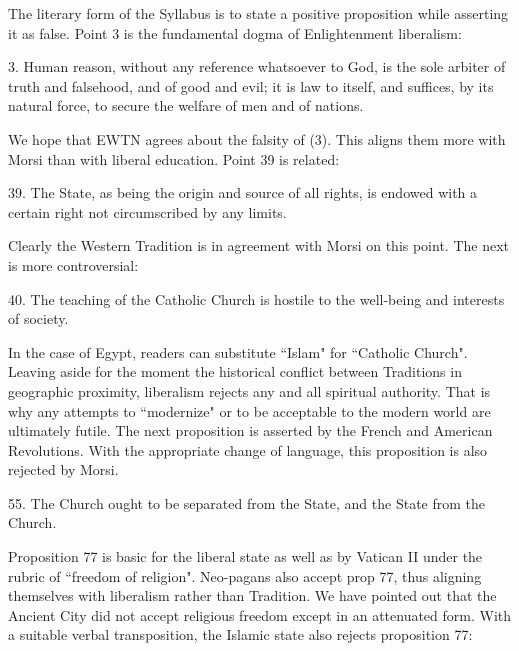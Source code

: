 The literary form of the Syllabus is to state a positive proposition while asserting it as false. Point 3 is the fundamental dogma of Enlightenment liberalism:

\begin{quotex}
3. Human reason, without any reference whatsoever to God, is the sole arbiter of truth and falsehood, and of good and evil; it is law to itself, and suffices, by its natural force, to secure the welfare of men and of nations. 

\end{quotex}
We hope that EWTN agrees about the falsity of (3). This aligns them more with Morsi than with liberal education. Point 39 is related:

\begin{quotex}
39. The State, as being the origin and source of all rights, is endowed with a certain right not circumscribed by any limits. 

\end{quotex}
Clearly the Western Tradition is in agreement with Morsi on this point. The next is more controversial:

\begin{quotex}
40. The teaching of the Catholic Church is hostile to the well-being and interests of society. 

\end{quotex}
In the case of Egypt, readers can substitute ``Islam" for ``Catholic Church". Leaving aside for the moment the historical conflict between Traditions in geographic proximity, liberalism rejects any and all spiritual authority. That is why any attempts to ``modernize" or to be acceptable to the modern world are ultimately futile. The next proposition is asserted by the French and American Revolutions. With the appropriate change of language, this proposition is also rejected by Morsi.

\begin{quotex}
55. The Church ought to be separated from the State, and the State from the Church. 

\end{quotex}
Proposition 77 is basic for the liberal state as well as by Vatican II under the rubric of ``freedom of religion". Neo-pagans also accept prop 77, thus aligning themselves with liberalism rather than Tradition. We have pointed out that the Ancient City did not accept religious freedom except in an attenuated form. With a suitable verbal transposition, the Islamic state also rejects proposition 77:

